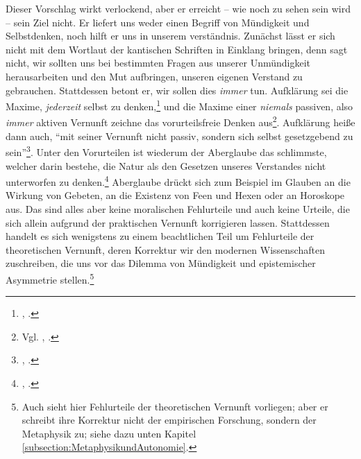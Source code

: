 Dieser Vorschlag wirkt verlockend, aber er erreicht -- wie noch zu sehen sein
wird -- sein Ziel nicht. Er liefert uns weder einen Begriff von Mündigkeit und
Selbstdenken, noch hilft er uns in unserem verständnis.
Zunächst lässt er sich nicht mit dem Wortlaut der kantischen Schriften in Einklang bringen, denn 
sagt nicht, wir sollten uns bei bestimmten Fragen aus unserer Unmündigkeit
herausarbeiten und den Mut aufbringen, unseren eigenen Verstand zu gebrauchen.
Stattdessen betont er, wir sollen dies \emph{immer} tun. Aufklärung sei die
Maxime, \emph{jederzeit} selbst zu denken,\footnote{\cite[Vgl.][A
329]{Kant:Washeisst:SichimDenkenorientieren?1977},
\cite[][VIII: 146.30--31]{Kant:GesammelteWerke1900ff.}.} und die Maxime einer \emph{niemals}
passiven, also \emph{immer} aktiven Vernunft zeichne das vorurteilsfreie Denken
aus\footnote{Vgl. \cite[][\S~40]{Kant:KritikderUrteilskraft2009}, \cite[][V:
294.20]{Kant:GesammelteWerke1900ff.}.}. Aufklärung heiße dann auch, \enquote{mit
seiner Vernunft nicht passiv, sondern  sich selbst
gesetzgebend zu sein}\footnote{\cite[][\S~40]{Kant:KritikderUrteilskraft2009},
\cite[][V:
294.30--31]{Kant:GesammelteWerke1900ff.}.}. Unter den Vorurteilen ist wiederum
der Aberglaube das schlimmste, welcher darin bestehe, die Natur als den Gesetzen
unseres Verstandes nicht unterworfen zu
denken.\footnote{\cite[Vgl.][\S~40]{Kant:KritikderUrteilskraft2009}, \cite[][V:
294.22--24]{Kant:GesammelteWerke1900ff.}.} Aberglaube drückt sich zum Beispiel
im Glauben an die Wirkung von Gebeten, an die Existenz von Feen und
Hexen oder an Horoskope aus. Das sind alles aber keine moralischen Fehlurteile und auch
keine Urteile, die sich allein aufgrund der praktischen Vernunft korrigieren
lassen. Stattdessen handelt es sich wenigstens zu einem beachtlichen Teil um
Fehlurteile der theoretischen Vernunft, deren Korrektur wir den modernen
Wissenschaften zuschreiben, die uns vor das Dilemma von Mündigkeit und
epistemischer Asymmetrie stellen.\footnote{Auch  sieht
hier Fehlurteile der theoretischen Vernunft vorliegen; aber er schreibt ihre
Korrektur nicht der empirischen Forschung, sondern der Metaphysik zu; siehe
dazu unten Kapitel \ref{subsection:MetaphysikundAutonomie}.}

